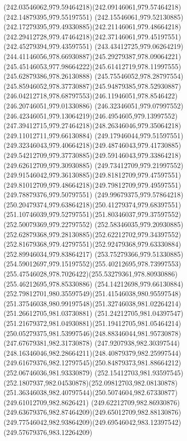 {{  \curveto(242.03546062,979.59464218)(242.09146061,979.57464218)(242.14879395,979.55197551)
  \curveto(242.15546061,979.52130885)(242.17279395,979.49330885)(242.21146061,979.48664218)
  \curveto(242.29412728,979.47464218)(242.37146061,979.45197551)(242.45279394,979.43597551)
  \curveto(243.43412725,979.06264219)(244.41146056,978.66930887)(245.29279387,978.09064221)
  \curveto(245.45146053,977.98664222)(245.61412719,978.11997555)(245.62879386,978.26130888)
  \curveto(245.75546052,978.28797554)(245.85946052,978.37730887)(245.94879385,978.52930887)
  \curveto(246.04212718,978.68797553)(246.11946051,978.8546422)(246.20746051,979.01330886)
  \curveto(246.32346051,979.07997552)(246.42346051,979.13064219)(246.4954605,979.13997552)
  \curveto(247.39412715,979.27464218)(248.26346046,979.35064218)(249.11012711,979.66130884)
  \curveto(249.17946044,979.51597551)(249.32346043,979.40664218)(249.48746043,979.41730885)
  \curveto(249.54212709,979.37730885)(249.59146043,979.33864218)(249.62612709,979.30930885)
  \curveto(249.73412709,979.21997552)(249.91546042,979.36130885)(249.81812709,979.47597551)
  \curveto(249.81012709,979.48664218)(249.79812709,979.49597551)(249.78879376,979.50797551)
  \curveto(249.99679375,979.57864218)(250.20479374,979.63864218)(250.41279374,979.68397551)
  \curveto(251.10746039,979.52797551)(251.80346037,979.37597552)(252.50079369,979.22797552)
  \curveto(252.58346035,979.20930885)(252.62879368,979.28130885)(252.62212702,979.34397552)
  \curveto(252.81679368,979.42797551)(252.92479368,979.63330884)(252.89946034,979.83864217)
  \curveto(253.75279366,979.51330885)(254.59012697,979.15197552)(255.40212695,978.73997553)
  \curveto(255.47546028,978.7026422)(255.53279361,978.80930886)(255.46212695,978.85330886)
  \curveto(254.14212698,979.66130884)(252.79812701,980.35597549)(251.41546038,980.95597548)
  \curveto(251.37546038,980.99197548)(251.32746038,981.02264214)(251.26612705,981.03730881)
  \curveto(251.24212705,981.04397547)(251.21679372,981.04930881)(251.19412705,981.05464214)
  \curveto(250.05279375,981.53997546)(248.88346044,981.95730878)(247.67679381,982.31730878)
  \curveto(247.9207938,982.30397544)(248.16346046,982.28664211)(248.40879379,982.25997544)
  \curveto(249.61679376,982.12797545)(250.84879373,981.88664212)(252.06746036,981.93330879)
  \curveto(252.15412703,981.93597545)(252.1807937,982.04530878)(252.09812703,982.08130878)
  \curveto(251.36346038,982.40797544)(250.5074604,982.67330877)(249.61012709,982.8626421)
  \curveto(249.62212709,982.86930876)(249.63679376,982.87464209)(249.65012709,982.88130876)
  \curveto(249.77546042,982.93864209)(249.69546042,983.12397542)(249.57679376,983.12264209)
}}
